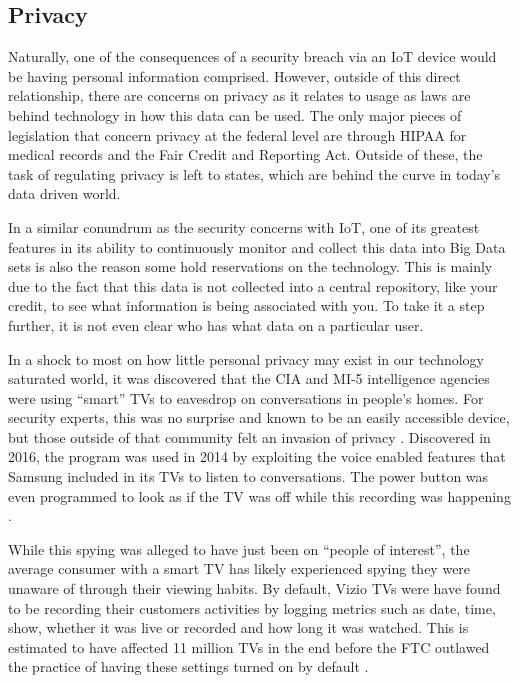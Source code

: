 \documentclass[sigconf]{acmart}
\begin{document}
\subsection{Privacy}

Naturally, one of the consequences of a security breach via an IoT device would be having personal information comprised. However, outside of this direct relationship, there are concerns on privacy as it relates to usage as laws are behind technology in how this data can be used. The only major pieces of legislation that concern privacy at the federal level are through HIPAA for medical records and the Fair Credit and Reporting Act. Outside of these, the task of regulating privacy is left to states, which are behind the curve in today's data driven world. 

In a similar conundrum as the security concerns with IoT, one of its greatest features in its ability to continuously monitor and collect this data into Big Data sets is also the reason some hold reservations on the technology. This is mainly due to the fact that this data is not collected into a central repository, like your credit, to see what information is being associated with you. To take it a step further, it is not even clear who has what data on a particular user.

In a shock to most on how little personal privacy may exist in our technology saturated world, it was discovered that the CIA and MI-5 intelligence agencies were using ``smart'' TVs to eavesdrop on conversations in people's homes. For security experts, this was no surprise and known to be an easily accessible device, but those outside of that community felt an invasion of privacy \cite{smarttvdumb}. Discovered in 2016, the program was used in 2014 by exploiting the voice enabled features that Samsung included in its TVs to listen to conversations. The power button was even programmed to look as if the TV was off while this recording was happening \cite{smarttvspy}. 

While this spying was alleged to have just been on ``people of interest'', the average consumer with a smart TV has likely experienced spying they were unaware of through their viewing habits. By default, Vizio TVs were have found to be recording their customers activities by logging metrics such as date, time, show, whether it was live or recorded and how long it was watched. This is estimated to have affected 11 million TVs in the end before the FTC outlawed the practice of having these settings turned on by default \cite{smarttvsettle}. 
\end{document}
